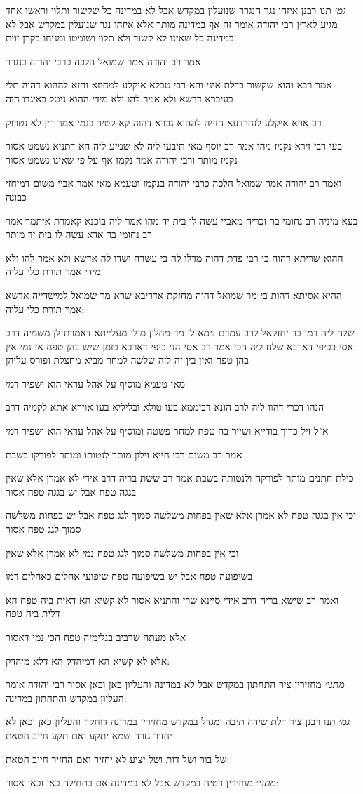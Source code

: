 \documentclass[12pt, openany]{book}
\newcommand{\sethebfont}{
\fontsize{10.5pt}{21.0pt} \selectfont
}
\newcommand{\textblock}[1]{
{\sethebfont #1\\}	
}
\begin{document}
\textblock{{\large\emph{גמ׳}} תנו רבנן איזהו נגר הנגרר שנועלין במקדש אבל לא במדינה כל שקשור ותלוי וראשו אחד מגיע לארץ רבי יהודה אומר זה אף במדינה מותר אלא איזהו נגר שנועלין במקדש אבל לא במדינה כל שאינו לא קשור ולא תלוי ושומטו ומניחו בקרן זוית}
\textblock{אמר רב יהודה אמר שמואל הלכה כרבי יהודה בנגרר}
\textblock{אמר רבא והוא שקשור בדלת איני והא רבי טבלא איקלע למחוזא וחזא לההוא דהוה תלי בעיברא דדשא ולא אמר להו ולא מידי ההוא ניטל באיגדו הוה}
\textblock{רב אויא איקלע לנהרדעא חזייה לההוא גברא דהוה קא קטיר בגמי אמר דין לא נטרוק}
\textblock{בעי רבי זירא נקמז מהו אמר רב יוסף מאי תיבעי ליה לא שמיע ליה הא דתניא נשמט אסור נקמז מותר ורבי יהודה אמר נקמז אף על פי שאינו נשמט אסור}
\textblock{ואמר רב יהודה אמר שמואל הלכה כרבי יהודה בנקמז וטעמא מאי אמר אביי משום דמיחזי כבונה}
\textblock{בעא מיניה רב נחומי בר זכריה מאביי עשה לו בית יד מהו אמר ליה בוכנא קאמרת איתמר אמר רב נחומי בר אדא עשה לו בית יד מותר}
\textblock{ההוא שריתא דהוה בי רבי פדת דהוה מדלו לה בי עשרה ושדו לה אדשא ולא אמר להו ולא מידי אמר תורת כלי עליה}
\textblock{ההיא אסיתא דהות בי מר שמואל דהוה מחזקת אדריבא שרא מר שמואל למישדייה אדשא אמר תורת כלי עליה:}
\textblock{שלח ליה רמי בר יחזקאל לרב עמרם נימא לן מר מהלין מילי מעלייתא דאמרת לן משמיה דרב אסי בכיפי דארבא שלח ליה הכי אמר רב אסי הני כיפי דארבא בזמן שיש בהן טפח אי נמי אין בהן טפח ואין בין זה לזה שלשה למחר מביא מחצלת ופורס עליהן}
\textblock{מאי טעמא מוסיף על אהל עראי הוא ושפיר דמי}
\textblock{הנהו דכרי דהוו ליה לרב הונא דביממא בעו טולא ובליליא בעו אוירא אתא לקמיה דרב}
\textblock{א"ל זיל כרוך בודייא ושייר בה טפח למחר פשטה ומוסיף על אהל עראי הוא ושפיר דמי}
\textblock{אמר רב משום רבי חייא וילון מותר לנטותו ומותר לפורקו בשבת}
\textblock{כילת חתנים מותר לפורקה ולנטותה בשבת אמר רב ששת בריה דרב אידי לא אמרן אלא שאין בגגה טפח אבל יש בגגה טפח אסור}
\textblock{וכי אין בגגה טפח לא אמרן אלא שאין בפחות משלשה סמוך לגג טפח אבל יש בפחות משלשה סמוך לגג טפח אסור}
\textblock{וכי אין בפחות משלשה סמוך לגג טפח נמי לא אמרן אלא שאין}
\textblock{בשיפועה טפח אבל יש בשיפועה טפח שיפועי אהלים כאהלים דמו}
\textblock{ואמר רב שישא בריה דרב אידי סיינא שרי והתניא אסור לא קשיא הא דאית ביה טפח הא דלית ביה טפח}
\textblock{אלא מעתה שרביב בגלימיה טפח הכי נמי דאסור}
\textblock{אלא לא קשיא הא דמיהדק הא דלא מיהדק:}
\textblock{{\large\emph{מתני׳}} מחזירין ציר התחתון במקדש אבל לא במדינה והעליון כאן וכאן אסור רבי יהודה אומר העליון במקדש והתחתון במדינה:}
\textblock{{\large\emph{גמ׳}} תנו רבנן ציר דלת שידה תיבה ומגדל במקדש מחזירין במדינה דוחקין והעליון כאן וכאן לא יחזיר גזרה שמא יתקע ואם תקע חייב חטאת}
\textblock{של בור ושל דות ושל יציע לא יחזיר ואם החזיר חייב חטאת:}
\textblock{{\large\emph{מתני׳}} מחזירין רטיה במקדש אבל לא במדינה אם בתחילה כאן וכאן אסור:}
\end{document}

